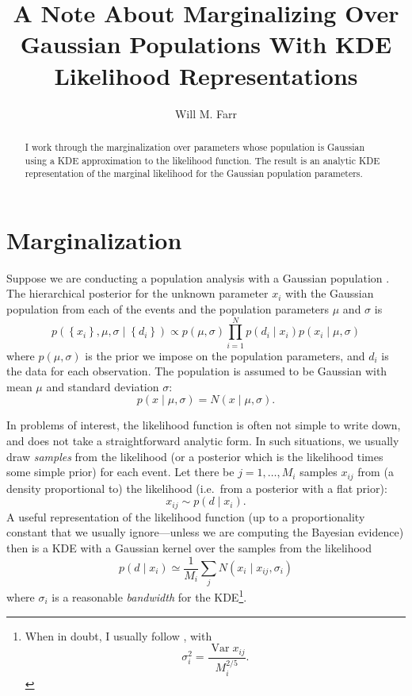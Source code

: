 \documentclass[modern]{aastex631}
\DeclareMathOperator{\var}{Var}
\begin{document}
\title{A Note About Marginalizing Over Gaussian Populations With KDE Likelihood Representations}

\author[0000-0003-1540-8562]{Will M. Farr}

\begin{abstract}
    I work through the marginalization over parameters whose population is
    Gaussian using a \ac{KDE} approximation to the likelihood function.  The
    result is an analytic \ac{KDE} representation of the marginal likelihood for
    the Gaussian population parameters. 
\end{abstract}

\section{Marginalization}

Suppose we are conducting a population analysis with a Gaussian population
\citep[e.g.][]{Isi2019,Miller2020}.  The hierarchical posterior for the unknown
parameter $x_i$ with the Gaussian population from each of the events and the
population parameters $\mu$ and $\sigma$ is 
\begin{equation}
    \label{eq:full-posterior}
    p\left( \left\{ x_i \right\}, \mu, \sigma \mid \left\{ d_i \right\} \right) \propto p\left( \mu, \sigma \right) \prod_{i=1}^N p\left( d_i \mid x_i \right) p\left( x_i \mid \mu, \sigma \right)
\end{equation}
where $p\left( \mu, \sigma \right)$ is the prior we impose on the population
parameters, and $d_i$ is the data for each observation.  The population is
assumed to be Gaussian with mean $\mu$ and standard deviation $\sigma$:
\begin{equation}
    p\left( x \mid \mu, \sigma \right) = N\left( x \mid \mu, \sigma \right).
\end{equation}

In problems of interest, the likelihood function is often not simple to write
down, and does not take a straightforward analytic form.  In such situations, we
usually draw \emph{samples} from the likelihood (or a posterior which is the
likelihood times some simple prior) for each event.  Let there be $j = 1,
\ldots, M_i$ samples $x_{ij}$ from (a density proportional to) the likelihood
(i.e.\ from a posterior with a flat prior):
\begin{equation}
    x_{ij} \sim p\left( d \mid x_i \right).
\end{equation}
A useful representation of the likelihood function (up to a proportionality
constant that we usually ignore---unless we are computing the Bayesian evidence)
then is a \ac{KDE} with a Gaussian kernel over the samples from the likelihood
\begin{equation}
    p\left( d \mid x_i \right) \simeq \frac{1}{M_i} \sum_{j} N\left( x_i \mid x_{ij}, \sigma_i \right)
\end{equation}
where $\sigma_i$ is a reasonable \emph{bandwidth} for the \ac{KDE}\footnote{When
in doubt, I usually follow \citet{Scott1992}, with 
\begin{equation}
    \sigma_i^2 = \frac{\var x_{ij}}{M_i^{2/5}}.
\end{equation}
}.
\end{document}
